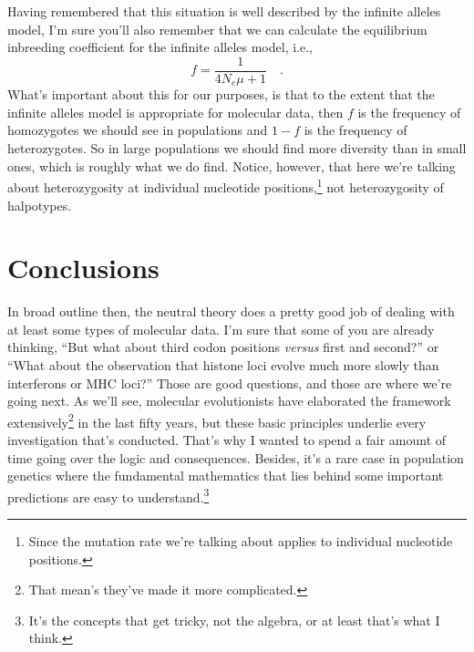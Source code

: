Having remembered that this situation is well described by the
infinite alleles model, I'm sure you'll also remember that we can
calculate the equilibrium inbreeding coefficient for the infinite
alleles model, i.e.,
\[
f = \frac{1}{4N_e\mu + 1} \quad .
\]
What's important about this for our purposes, is that to the extent
that the infinite alleles model is appropriate for molecular data,
then $f$ is the frequency of homozygotes we should see in populations
and $1-f$ is the frequency of heterozygotes. So in large populations
we should find more diversity than in small ones, which is roughly
what we do find. Notice, however, that here we're talking about
heterozygosity at individual nucleotide positions,\footnote{Since the
  mutation rate we're talking about applies to individual nucleotide
  positions.} not heterozygosity of halpotypes.

\section*{Conclusions}

In broad outline then, the neutral theory does a pretty good job of
dealing with at least some types of molecular data. I'm sure that some
of you are already thinking, ``But what about third codon positions
{\it versus\/} first and second?'' or ``What about the observation
that histone loci evolve much more slowly than interferons or MHC
loci?''  Those are good questions, and those are where we're going
next. As we'll see, molecular evolutionists have elaborated the
framework extensively\footnote{That mean's they've made it more
  complicated.} in the last fifty years, but these basic principles
underlie every investigation that's conducted. That's why I wanted to
spend a fair amount of time going over the logic and
consequences. Besides, it's a rare case in population genetics where
the fundamental mathematics that lies behind some important
predictions are easy to understand.\footnote{It's the concepts that
  get tricky, not the algebra, or at least that's what I think.}

